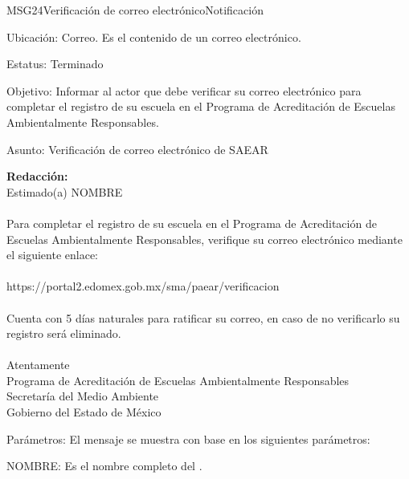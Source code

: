\begin{mensaje}{MSG24}{Verificación de correo electrónico}{Notificación}
	\item[Ubicación:] Correo. Es el contenido de un correo electrónico.
	\item[Estatus:] Terminado
	\item[Objetivo:] Informar al actor que debe verificar su correo electrónico para completar el registro de su escuela en el Programa de Acreditación de Escuelas Ambientalmente Responsables.
	\item[Asunto:] Verificación de correo electrónico de SAEAR
	\item[]{\bf Redacción:}\\
			  Estimado(a) NOMBRE\\ \\
			  Para completar el registro de su escuela en el Programa de Acreditación de Escuelas Ambientalmente Responsables, verifique su correo electrónico mediante el siguiente enlace:\\ \\
			  https://portal2.edomex.gob.mx/sma/paear/verificacion   \\ \\
			  Cuenta con 5 días naturales para ratificar su correo, en caso de no verificarlo su registro será eliminado.\\ \\
			  Atentamente\\
			  Programa de Acreditación de Escuelas Ambientalmente Responsables\\
			  Secretaría del Medio Ambiente\\
			  Gobierno del Estado de México\\
	\item[Parámetros:] El mensaje se muestra con base en los siguientes parámetros:
	\begin{Citemize}
		\item NOMBRE: Es el nombre completo del .
	\end{Citemize}
\end{mensaje}
